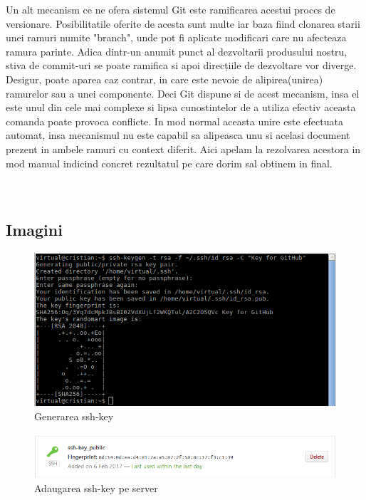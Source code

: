 Un alt mecanism ce ne ofera sistemul Git este ramificarea acestui proces de versionare. Posibilitatile oferite de acesta sunt multe iar baza fiind clonarea starii unei ramuri numite "branch", unde pot fi aplicate modificari care nu afecteaza ramura parinte. Adica dintr-un anumit punct al dezvoltarii produsului nostru, stiva de commit-uri se poate ramifica si apoi direcțiile de dezvoltare vor diverge. Desigur, poate aparea caz contrar, in care este nevoie de alipirea(unirea) ramurelor sau a unei componente. Deci Git dispune si de acest mecanism, insa el este unul din cele mai complexe si lipsa cunostintelor de a utiliza efectiv aceasta comanda poate provoca conflicte. In mod normal aceasta unire este efectuata automat, insa mecanismul nu este capabil sa alipeasca unu si acelasi document prezent in ambele ramuri cu context diferit. Aici apelam la rezolvarea acestora in mod manual indicind concret rezultatul pe care dorim sal obtinem in final.
\\
\\
\\



\subsection{Imagini}
\begin{figure}[htb]
	\begin{center}
		\centering
		\includegraphics[scale = 0.9]{img/ssh_key.png}
		\caption{Generarea ssh-key}%
		\label{fig:generarea_ssh_key}
	\end{center}
\end{figure}

\begin{figure}[htb]
	\begin{center}
		\centering
		\includegraphics[scale = 0.8]{img/add_key_onserver.png}
		\caption{Adaugarea ssh-key pe server}%
		\label{fig:add_key_onserver}
	\end{center}
\end{figure}

